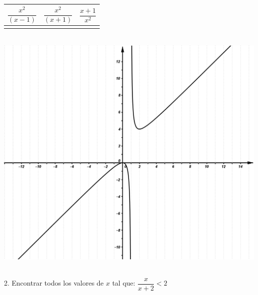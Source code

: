 \documentclass[a4paper,11pt,spanish,sans]{exam}
\newcommand{\Ts}{\rule{0pt}{2.8ex}}       %
\newcommand{\Bs}{\rule[-1.5ex]{0pt}{0pt}} %
\begin{document}
	\begin{minipage}{.5\textwidth}
		\centering
		\begin{tabular}{|c|c|c|}
			\hline
			$\dfrac{x^2}{(x-1)}$  & $\dfrac{x^2}{(x+1)}$ & $\dfrac{x+1}{x^2}$ \Ts \Bs   \\ \hline
			&   &      \\ \hline
		\end{tabular}\\
		\centering
		\includegraphics[width= 0.95\linewidth]{didacvulcano2.png}
	\end{minipage}\\
	2. Encontrar todos los valores de $x$ tal que: $\dfrac{x}{x+2}<2$
	
\end{document}
